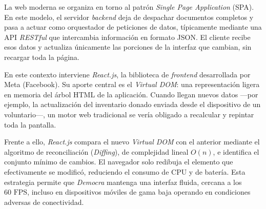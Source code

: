 La web moderna se organiza en torno al patrón \textit{Single Page Application}
(SPA). En este modelo, el servidor \textit{backend} deja de despachar documentos
completos y pasa a actuar como orquestador de peticiones de datos, típicamente
mediante una API \textit{RESTful} que intercambia información en formato JSON. El
cliente recibe esos datos y actualiza únicamente las porciones de la interfaz que
cambian, sin recargar toda la página.

En este contexto interviene \textit{React.js}, la biblioteca de \textit{frontend}
desarrollada por Meta (Facebook). Su aporte central es el \textit{Virtual DOM}: una
representación ligera en memoria del árbol HTML de la aplicación. Cuando llegan
nuevos datos ---por ejemplo, la actualización del inventario donado enviada desde el
dispositivo de un voluntario---, un motor web tradicional se vería obligado a
recalcular y repintar toda la pantalla.

Frente a ello, \textit{React.js} compara el nuevo \textit{Virtual DOM} con el
anterior mediante el algoritmo de reconciliación (\textit{Diffing}), de complejidad
lineal $O(n)$, e identifica el conjunto mínimo de cambios. El navegador solo
redibuja el elemento que efectivamente se modificó, reduciendo el consumo de CPU y
de batería. Esta estrategia permite que \textit{Democra} mantenga una interfaz
fluida, cercana a los $60\text{ FPS}$, incluso en dispositivos móviles de gama baja
operando en condiciones adversas de conectividad.
